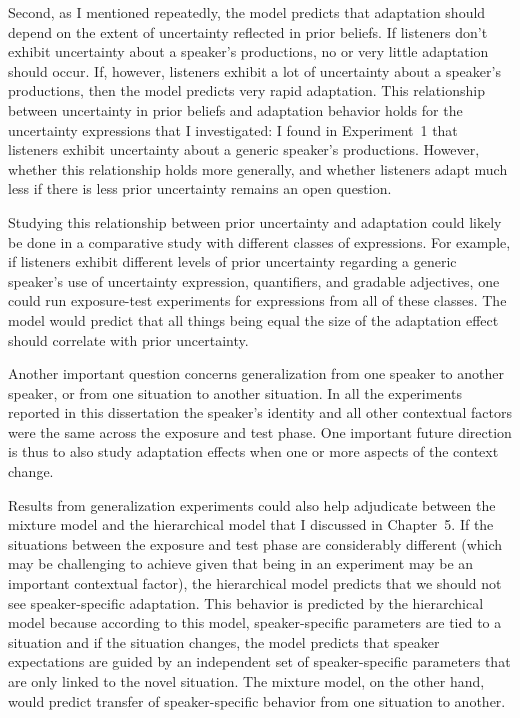 Second, as I mentioned repeatedly, the model predicts that adaptation should depend on the extent of uncertainty reflected in prior beliefs. If listeners don't exhibit uncertainty about a speaker's productions, no or very little adaptation should occur. If, however, listeners exhibit a lot of uncertainty about a speaker's productions, then the model predicts
very rapid adaptation. This relationship between uncertainty in prior beliefs and adaptation behavior holds for the uncertainty expressions that I investigated: I found in Experiment~1 that listeners exhibit uncertainty about a generic speaker's productions. However, whether this relationship holds more generally, and whether listeners adapt much less if there is less prior uncertainty remains an open question. 

Studying this relationship between prior uncertainty and adaptation could likely be done in a comparative study with different classes of expressions. For example, if listeners exhibit different levels of prior uncertainty regarding a generic speaker's use of uncertainty expression, quantifiers, and gradable adjectives, one could run exposure-test experiments for expressions from all of these classes. The model would predict that all things being equal the size of the adaptation effect should correlate with prior uncertainty.

Another important question concerns generalization from one speaker to another speaker, or from one situation to another situation. In all the experiments reported in this dissertation the speaker's identity and all other contextual factors were the same across the exposure and test phase. One important future direction is thus to also study adaptation effects when one or more aspects of the context change. 

Results from generalization experiments could also help adjudicate between the mixture model and the hierarchical model that I discussed in Chapter~5. If the situations between the exposure and test phase are considerably different (which may be challenging to achieve given that being in an experiment may be an important contextual factor), the hierarchical model predicts that we should not see speaker-specific adaptation. This behavior is predicted by the hierarchical model  because according to this model, speaker-specific parameters are tied to a situation and if the situation changes, the model predicts that speaker expectations are guided by an independent set of speaker-specific parameters that are only linked to the novel situation. The mixture model, on the other hand, would predict transfer of speaker-specific behavior from one situation to another.

